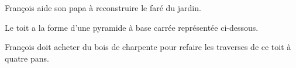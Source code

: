 
\medskip

François aide son papa à reconstruire le faré du jardin.

Le toit a la forme d'une pyramide à base carrée représentée ci-dessous.

François doit acheter du bois de charpente pour refaire les traverses de ce toit à quatre pans.
%

